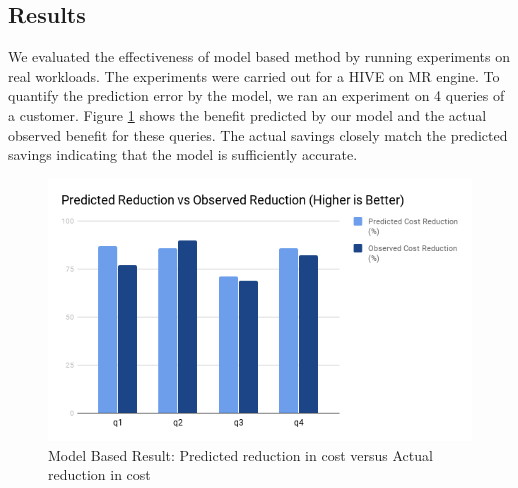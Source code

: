 %

\subsection{Results}
We evaluated the effectiveness of model based method by running experiments on real workloads. The experiments were carried out for a HIVE on MR engine. To quantify the prediction error by the model, we ran an experiment on 4 queries of a customer. Figure \ref{fig:modelbasedresult} shows the benefit predicted by our model and the actual observed benefit for these queries. The actual savings closely match the predicted savings indicating that the model is sufficiently accurate.

\begin{figure}[h]
	\includegraphics[width=\linewidth]{chart.png}
	\caption{Model Based Result: Predicted reduction in cost versus Actual reduction in cost}
	\label{fig:modelbasedresult}
\end{figure}
